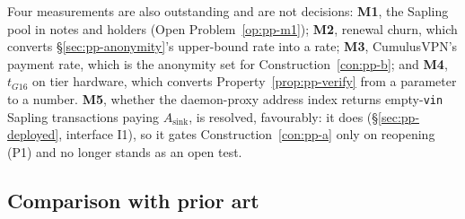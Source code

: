 Four measurements are also outstanding and are not decisions: \textbf{M1}, the Sapling pool in notes
and holders (Open Problem~\ref{op:pp-m1}); \textbf{M2}, renewal churn, which converts
\S\ref{sec:pp-anonymity}'s upper-bound rate into a rate; \textbf{M3}, CumulusVPN's payment rate, which
is the anonymity set for Construction~\ref{con:pp-b}; and \textbf{M4}, $t_{G16}$ on tier hardware,
which converts Property~\ref{prop:pp-verify} from a parameter to a number. \textbf{M5}, whether the
daemon-proxy address index returns empty-\texttt{vin} Sapling transactions paying $A_{\mathrm{sink}}$,
is resolved, favourably: it does (\S\ref{sec:pp-deployed}, interface I1), so it gates
Construction~\ref{con:pp-a} only on reopening (P1) and no longer stands as an open test.

\subsection{Comparison with prior art}
\label{sec:pp-related}

